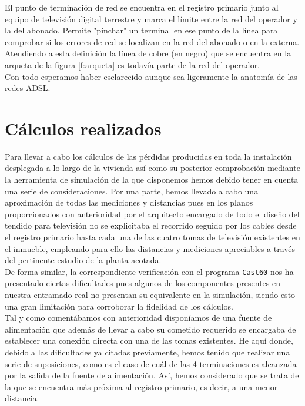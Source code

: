 \documentclass{article}[12 pt]
\begin{document}
			El punto de terminación de red se encuentra en el registro primario junto al equipo de televisión digital terrestre y marca el límite entre la red del operador y la del abonado. Permite "pinchar" un terminal en ese punto de la línea para comprobar si los errores de red se localizan en la red del abonado o en la externa. Atendiendo a esta definición la línea de cobre (en negro) que se encuentra en la arqueta de la figura \ref{f:arqueta} es todavía parte de la red del operador.\\

			Con todo esperamos haber esclarecido aunque sea ligeramente la anatomía de las redes ADSL.

	\newpage

	\section{Cálculos realizados}
		Para llevar a cabo los cálculos de las pérdidas producidas en toda la instalación desplegada a lo largo de la vivienda así como su posterior comprobación mediante la herramienta de simulación de la que disponemos hemos debido tener en cuenta una serie de consideraciones. Por una parte, hemos llevado a cabo una aproximación de todas las mediciones y distancias pues en los planos proporcionados con anterioridad por el arquitecto encargado de todo el diseño del tendido para televisión no se explicitaba el recorrido seguido por los cables desde el registro primario hasta cada una de las cuatro tomas de televisión existentes en el inmueble, empleando para ello las distancias y mediciones apreciables a través del pertinente estudio de la planta acotada.\\

		De forma similar, la correspondiente verificación con el programa \texttt{Cast60} nos ha presentado ciertas dificultades pues algunos de los componentes presentes en nuestra entramado real no presentan su equivalente en la simulación, siendo esto una gran limitación para corroborar la fidelidad de los cálculos.\\

		Tal y como comentábamos con anterioridad disponíamos de una fuente de alimentación que además de llevar a cabo su cometido requerido se encargaba de establecer una conexión directa con una de las tomas existentes. He aquí donde, debido a las dificultades ya citadas previamente, hemos tenido que realizar una serie de suposiciones, como es el caso de cuál de las 4 terminaciones es alcanzada por la salida de la fuente de alimentación. Así, hemos considerado que se trata de la que se encuentra más próxima al registro primario, es decir, a una menor distancia.\\
\end{document}
